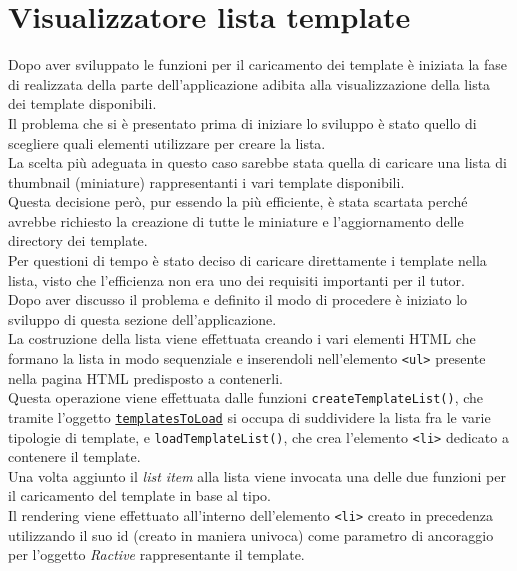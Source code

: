 \section{Visualizzatore lista template}
Dopo aver sviluppato le funzioni per il caricamento dei template è iniziata la fase di realizzata della parte dell'applicazione adibita alla visualizzazione della lista dei template disponibili.\\
Il problema che si è presentato prima di iniziare lo sviluppo è stato quello di scegliere quali elementi utilizzare per creare la lista.\\
La scelta più adeguata in questo caso sarebbe stata quella di caricare una lista di thumbnail (miniature) rappresentanti i vari template disponibili.\\
Questa decisione però, pur essendo la più efficiente, è stata scartata perché avrebbe richiesto la creazione di tutte le miniature e l'aggiornamento delle directory dei template.\\
Per questioni di tempo è stato deciso di caricare direttamente i template nella lista, visto che l'efficienza non era uno dei requisiti importanti per il tutor.\\
Dopo aver discusso il problema e definito il modo di procedere è iniziato lo sviluppo di questa sezione dell'applicazione.\\
La costruzione della lista viene effettuata creando i vari elementi HTML che formano la lista in modo sequenziale e inserendoli nell'elemento \texttt{<ul>} presente nella pagina HTML predisposto a contenerli.\\
Questa operazione viene effettuata dalle funzioni \texttt{createTemplateList()}, che tramite l'oggetto \hyperref[ttlObject]{\texttt{templatesToLoad}} si occupa di suddividere la lista fra le varie tipologie di template, e \texttt{loadTemplateList()}, che crea l'elemento \texttt{<li>} dedicato a contenere il template.\\
Una volta aggiunto il \textit{list item} alla lista viene invocata una delle due funzioni per il caricamento del template in base al tipo.\\
Il rendering viene effettuato all'interno dell'elemento \texttt{<li>} creato in precedenza utilizzando il suo id (creato in maniera univoca) come parametro di ancoraggio per l'oggetto \textit{Ractive} rappresentante il template.
